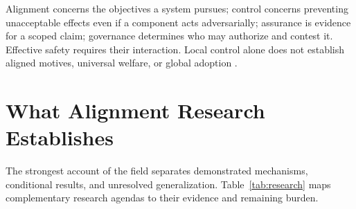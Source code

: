 \documentclass[10pt,twocolumn,letterpaper]{article}
\begin{document}
Alignment concerns the objectives a system pursues; control concerns preventing unacceptable effects even if a component acts adversarially; assurance is evidence for a scoped claim; governance determines who may authorize and contest it. Effective safety requires their interaction. Local control alone does not establish aligned motives, universal welfare, or global adoption \cite{gabriel,pluralism,gradual}.

\section{What Alignment Research Establishes}
\label{sec:research}
The strongest account of the field separates demonstrated mechanisms, conditional results, and unresolved generalization. Table~\ref{tab:research} maps complementary research agendas to their evidence and remaining burden.
\end{document}
